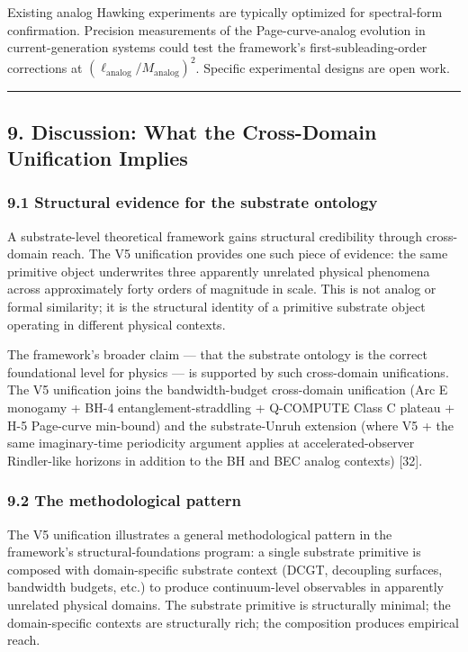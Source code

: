 \documentclass[
  11pt,
  a4paperpaper,
]{article}
\begin{document}
Existing analog Hawking experiments are typically optimized for
spectral-form confirmation. Precision measurements of the
Page-curve-analog evolution in current-generation systems could test the
framework's first-subleading-order corrections at
\((\ell_{\mathrm{analog}}/M_{\mathrm{analog}})^2\). Specific
experimental designs are open work.

\begin{center}\rule{0.5\linewidth}{0.5pt}\end{center}

\subsection{9. Discussion: What the Cross-Domain Unification
Implies}\label{discussion-what-the-cross-domain-unification-implies}

\subsubsection{9.1 Structural evidence for the substrate
ontology}\label{structural-evidence-for-the-substrate-ontology}

A substrate-level theoretical framework gains structural credibility
through cross-domain reach. The V5 unification provides one such piece
of evidence: the same primitive object underwrites three apparently
unrelated physical phenomena across approximately forty orders of
magnitude in scale. This is not analog or formal similarity; it is the
structural identity of a primitive substrate object operating in
different physical contexts.

The framework's broader claim --- that the substrate ontology is the
correct foundational level for physics --- is supported by such
cross-domain unifications. The V5 unification joins the bandwidth-budget
cross-domain unification (Arc E monogamy + BH-4 entanglement-straddling
+ Q-COMPUTE Class C plateau + H-5 Page-curve min-bound) and the
substrate-Unruh extension (where V5 + the same imaginary-time
periodicity argument applies at accelerated-observer Rindler-like
horizons in addition to the BH and BEC analog contexts) {[}32{]}.

\subsubsection{9.2 The methodological
pattern}\label{the-methodological-pattern}

The V5 unification illustrates a general methodological pattern in the
framework's structural-foundations program: a single substrate primitive
is composed with domain-specific substrate context (DCGT, decoupling
surfaces, bandwidth budgets, etc.) to produce continuum-level
observables in apparently unrelated physical domains. The substrate
primitive is structurally minimal; the domain-specific contexts are
structurally rich; the composition produces empirical reach.
\end{document}
